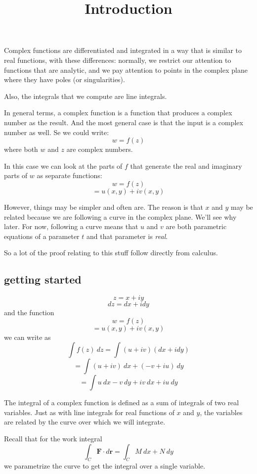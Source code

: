 \documentclass[11pt, oneside]{article}
\title{Introduction}
\date{}
\begin{document}
\maketitle
\Large

Complex functions are differentiated and integrated in a way that is similar to real functions, with these differences:  normally, we restrict our attention to functions that are analytic, and we pay attention to points in the complex plane where they have poles (or singularities).  

Also, the integrals that we compute are line integrals.

In general terms, a complex function is a function that produces a complex number as the result.  And the most general case is that the input is a complex number as well.  Se we could write:
\[ w = f(z) \]
where both $w$ and $z$ are complex numbers.

In this case we can look at the parts of $f$ that generate the real and imaginary parts of $w$ as separate functions:
\[ w = f(z) \]
\[ = u(x,y) + iv(x,y) \]

However, things may be simpler and often are.  The reason is that $x$ and $y$ may be related because we are following a curve in the complex plane.  We'll see why later.  For now, following a curve means that $u$ and $v$ are both parametric equations of a parameter $t$ and that parameter is \emph{real}.

So a lot of the proof relating to this stuff follow directly from calculus.

\subsection*{getting started}

\[ z = x + i y \]
\[ dz = dx + i dy \]
and the function
\[ w = f(z) \]
\[ = u(x,y) + iv(x,y) \]
we can write as
 \[ \int f(z) \ dz = \int (u + i v) (dx + i dy) \]
\[ = \int (u + iv) \ dx + (- v + i u) \ dy \]
\[ = \int u \ dx - v \ dy + iv \ dx + iu \ dy \]

The integral of a complex function is defined as a sum of integrals of two real variables.  Just as with line integrals for real functions of $x$ and $y$, the variables are related by the curve over which we will integrate.

Recall that for the work integral
\[ \int_C \mathbf{F} \cdot d \mathbf{r} = \int_C M \ dx + N \ dy \]
we parametrize the curve to get the integral over a single variable.
\end{document}
